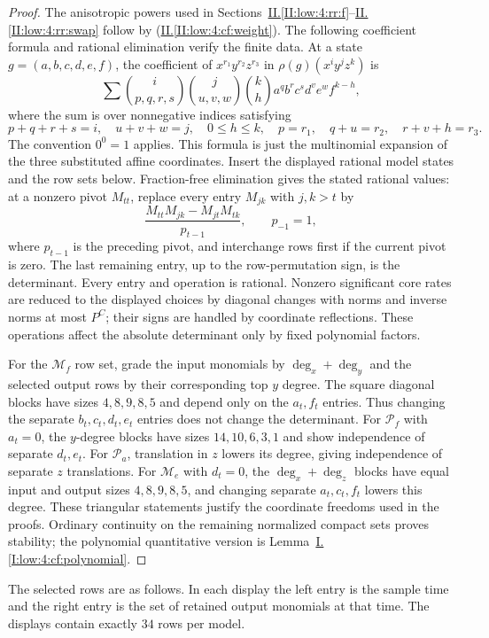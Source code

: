 \documentclass[11pt]{amsart}
\theoremstyle{definition}
\theoremstyle{remark}
\numberwithin{equation}{section}
\newcommand{\partIref}[1]{\hyperref[I:#1]{I.\ref*{I:#1}}}
\newcommand{\partIIref}[1]{\hyperref[II:#1]{II.\ref*{II:#1}}}
\newcommand{\partIIeqref}[1]{\textup{(\partIIref{#1})}}
\begin{document}
\begin{proof}
The anisotropic powers used in Sections~\partIIref{low:4:rr:f}--\partIIref{low:4:rr:swap} follow by \partIIeqref{low:4:cf:weight}. The following coefficient formula and rational elimination verify the finite data. At a state $g=(a,b,c,d,e,f)$, the coefficient of $x^{r_1}y^{r_2}z^{r_3}$ in $\rho(g)(x^iy^jz^k)$ is
\[
\sum\binom{i}{p,q,r,s}\binom{j}{u,v,w}\binom{k}{h}
a^q b^r c^s d^v e^w f^{k-h},
\]
where the sum is over nonnegative indices satisfying
\[
p+q+r+s=i,\quad u+v+w=j,\quad 0\le h\le k,\quad
p=r_1,\quad q+u=r_2,\quad r+v+h=r_3.
\]
The convention $0^0=1$ applies. This formula is just the multinomial expansion of the three substituted affine coordinates. Insert the displayed rational model states and the row sets below. Fraction-free elimination gives the stated rational values: at a nonzero pivot $M_{tt}$, replace every entry $M_{jk}$ with $j,k>t$ by
\[
\frac{M_{tt}M_{jk}-M_{jt}M_{tk}}{p_{t-1}},\qquad p_{-1}=1,
\]
where $p_{t-1}$ is the preceding pivot, and interchange rows first if the current pivot is zero. The last remaining entry, up to the row-permutation sign, is the determinant. Every entry and operation is rational. Nonzero significant core rates are reduced to the displayed choices by diagonal changes with norms and inverse norms at most $P^C$; their signs are handled by coordinate reflections. These operations affect the absolute determinant only by fixed polynomial factors.

For the $\mathcal M_f$ row set, grade the input monomials by $\deg_x+\deg_y$ and the selected output rows by their corresponding top $y$ degree. The square diagonal blocks have sizes $4,8,9,8,5$ and depend only on the $a_t,f_t$ entries. Thus changing the separate $b_t,c_t,d_t,e_t$ entries does not change the determinant. For $\mathcal P_f$ with $a_t=0$, the $y$-degree blocks have sizes $14,10,6,3,1$ and show independence of separate $d_t,e_t$. For $\mathcal P_a$, translation in $z$ lowers its degree, giving independence of separate $z$ translations. For $\mathcal M_e$ with $d_t=0$, the $\deg_x+\deg_z$ blocks have equal input and output sizes $4,8,9,8,5$, and changing separate $a_t,c_t,f_t$ lowers this degree. These triangular statements justify the coordinate freedoms used in the proofs. Ordinary continuity on the remaining normalized compact sets proves stability; the polynomial quantitative version is Lemma~\partIref{low:4:cf:polynomial}.
\end{proof}

The selected rows are as follows. In each display the left entry is the sample time and the right entry is the set of retained output monomials at that time. The displays contain exactly $34$ rows per model.
\end{document}
